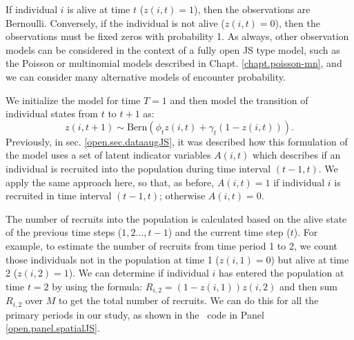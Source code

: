 If individual $i$ is alive at time $t$ ($z(i,t)=1$), then the
observations are Bernoulli.  Conversely, if the individual is not
alive ($z(i,t)=0$), then the observations must be fixed zeros with
probability 1.  As always, other observation models can be considered
in the context of a fully open JS type model, such as the Poisson or
multinomial models described in Chapt. \ref{chapt.poisson-mn}, and we
can consider many alternative models of encounter probability.

We initialize the
model for time $T=1$
and then model the transition of individual states from
$t$ to $t+1$ as:
\[
 z(i,t+1) \sim \mbox{Bern}( \phi_t z(i,t)  + \gamma_t (1-z(i,t)) ).
\]
Previously, in sec. \ref{open.sec.dataaugJS}, it was described how
this formulation of the model uses a set of latent indicator variables
$A(i,t)$ which describes if an individual is recruited into the
population during time interval $(t-1, t)$.  We apply the same
approach here, so that, as before, $A(i,t) = 1$ if individual $i$ is
recruited in time interval $(t-1, t)$; otherwise $A(i,t)=0$.

The number of recruits into the population is calculated based on the
alive state of the previous time steps ($1, 2 \dots, t-1$) and the
current time step ($t$).  For example, to estimate the number of
recruits from time period 1 to 2, we count those individuals not in
the population at time 1 ($z(i,1) = 0$) but alive at time 2 ($z(i,2) =
1$).  We can determine if individual $i$ has entered the population at
time $t=2$ by using the formula: $R_{i,2}=(1-z(i,1))z(i,2)$ and then
sum $R_{i,2}$ over $M$ to get the total number of recruits.  We can do
this for all the primary periods in our study, as shown in the
\jags~code in Panel \ref{open.panel.spatialJS}.


